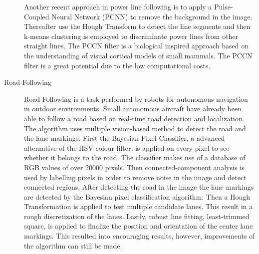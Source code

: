 \documentclass[a4paper]{article}
\begin{document}
\begin{description}
Another recent approach \cite{Zhengrong2008} in power line following is to apply a Pulse-Coupled Neural Network (PCNN) to remove the background in the image. Thereafter use the Hough Transform to detect the line segments and then k-means clustering is employed to discriminate power lines from other straight lines. The PCCN filter is a biological inspired approach based on the understanding of visual cortical models of small mammals. The PCCN filter is a great potential due to the low computational costs.

\item[Road-Following] Road-Following is a task performed by robots for autonomous navigation in outdoor environments. Small autonomous aircraft \cite{Frew2004} have already been able to follow a road based on real-time road detection and localization. The algorithm uses multiple vision-based method to detect the road and the lane markings. First the Bayesian Pixel Classifier, a advanced alternative of the HSV-colour filter, is applied on every pixel to see whether it belongs to the road. The classifier makes use of a database of RGB values of over 20000 pixels. Then connected-component analysis is used by labelling pixels in order to remove noise in the image and detect connected regions. After detecting the road in the image the lane markings are detected by the Bayesian pixel classification algorithm. Then a Hough Transformation is applied to test multiple candidate lanes. This result in a rough discretization of the lanes. Lastly, robust line fitting, least-trimmed square, is applied to finalize the position and orientation of the center lane markings. This resulted into encouraging results, however, improvements of the algorithm can still be made.


\end{description}
\end{document}
